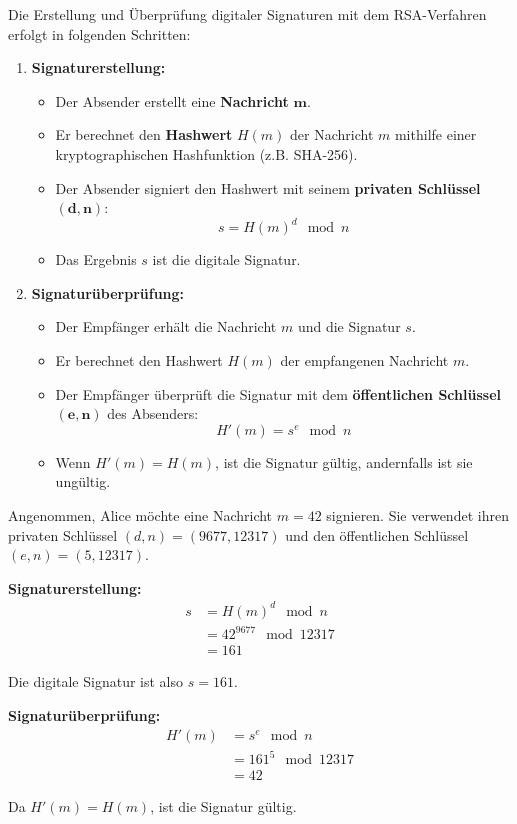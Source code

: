 \begin{myprocedure}
	Die Erstellung und Überprüfung digitaler Signaturen mit dem \gls{RSA}-Verfahren erfolgt in folgenden Schritten:
\begin{enumerate}
	\item \textbf{Signaturerstellung:}
	      \begin{itemize}
		      \item Der Absender erstellt eine \textbf{Nachricht} \( \mathbf{m} \).
		      \item Er berechnet den \textbf{Hashwert} \( H(m) \) der Nachricht \( m \) mithilfe einer kryptographischen Hashfunktion (z.B. SHA-256).
		      \item Der Absender signiert den Hashwert mit seinem \textbf{privaten Schlüssel} \( \mathbf{(d, n)} \):
		            \[
			            s = H(m)^d \mod n
		            \]
		      \item Das Ergebnis \( s \) ist die digitale Signatur.
	      \end{itemize}
	\item \textbf{Signaturüberprüfung:}
	      \begin{itemize}
		      \item Der Empfänger erhält die Nachricht \( m \) und die Signatur \( s \).
		      \item Er berechnet den Hashwert \( H(m) \) der empfangenen Nachricht \( m \).
		      \item Der Empfänger überprüft die Signatur mit dem \textbf{öffentlichen Schlüssel} \( \mathbf{(e, n)} \) des Absenders:
		            \[
			            H'(m) = s^e \mod n
		            \]
		      \item Wenn \( H'(m) = H(m) \), ist die Signatur gültig, andernfalls ist sie ungültig.
	      \end{itemize}
\end{enumerate}
\end{myprocedure}

\begin{myexample}
	Angenommen, Alice möchte eine Nachricht \( m = 42 \) signieren. Sie verwendet ihren privaten Schlüssel \( (d, n) = (9677, 12317) \) und den öffentlichen Schlüssel \( (e, n) = (5, 12317) \).

	\textbf{Signaturerstellung:}
	\begin{align*}
		s & = H(m)^d \mod n \\
		  & = 42^{9677} \mod 12317 \\
		  & = 161
	\end{align*}

	Die digitale Signatur ist also \( s = 161 \).

	\textbf{Signaturüberprüfung:}
	\begin{align*}
		H'(m) & = s^e \mod n \\
		      & = 161^5 \mod 12317 \\
		      & = 42
	\end{align*}

	Da \( H'(m) = H(m) \), ist die Signatur gültig.
\end{myexample}

